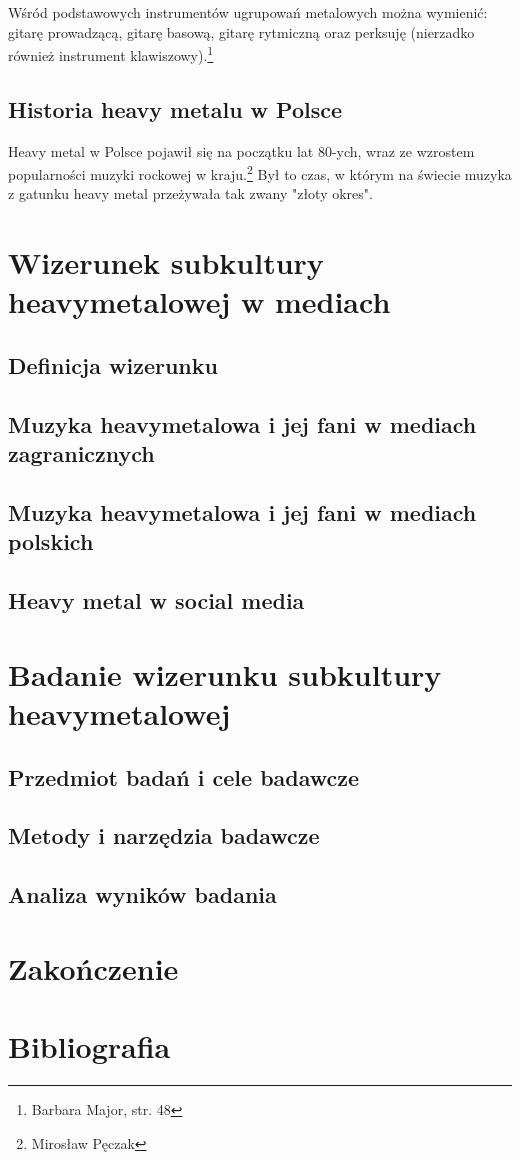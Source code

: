 \documentclass[12pt, a4paper, titlepage]{report}
\begin{document}
Wśród podstawowych instrumentów ugrupowań metalowych można wymienić: gitarę prowadzącą, gitarę basową, gitarę rytmiczną oraz perksuję (nierzadko również instrument klawiszowy).\footnote{Barbara Major, str. 48}

\section{Historia heavy metalu w Polsce}
Heavy metal w Polsce pojawił się na początku lat 80-ych, wraz ze wzrostem popularności muzyki rockowej w kraju.\footnote{Mirosław Pęczak} Był to czas, w którym na świecie muzyka z gatunku heavy metal przeżywała tak zwany "złoty okres".

\chapter{Wizerunek subkultury heavymetalowej w mediach}
\section{Definicja wizerunku}
\section{Muzyka heavymetalowa i jej fani w mediach zagranicznych}
\section{Muzyka heavymetalowa i jej fani w mediach polskich}
\section{Heavy metal w social media}
\chapter{Badanie wizerunku subkultury heavymetalowej}
\section{Przedmiot badań i cele badawcze}
\section{Metody i narzędzia badawcze}
\section{Analiza wyników badania}
\chapter*{Zakończenie}
\chapter*{Bibliografia}
\end{document}
